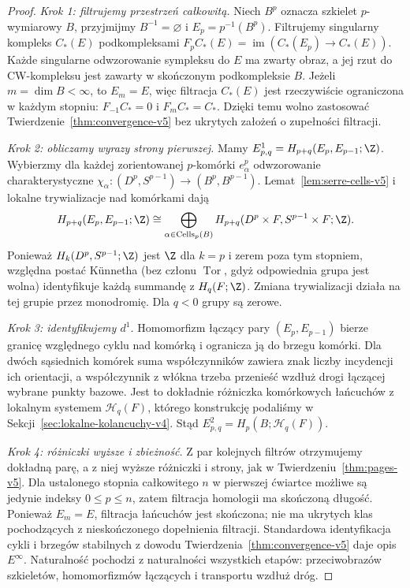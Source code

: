 \begin{proof}
\emph{Krok 1: filtrujemy przestrzeń całkowitą.}
Niech $B^p$ oznacza szkielet $p$-wymiarowy $B$, przyjmijmy
$B^{-1}=\varnothing$ i $E_p=p^{-1}(B^p)$.
Filtrujemy singularny kompleks $C_*(E)$ podkompleksami
$F_pC_*(E)=\operatorname{im}(C_*(E_p)\to C_*(E))$.
Każde singularne odwzorowanie sympleksu do $E$ ma zwarty obraz,
a jej rzut do CW-kompleksu jest zawarty w skończonym
podkompleksie $B$. Jeżeli $m=\dim B<\infty$, to
$E_m=E$, więc filtracja $C_*(E)$ jest rzeczywiście
ograniczona w każdym stopniu: $F_{-1}C_*=0$ i
$F_mC_*=C_*$. Dzięki temu wolno zastosować
Twierdzenie~\ref{thm:convergence-v5} bez ukrytych
założeń o zupełności filtracji.

\emph{Krok 2: obliczamy wyrazy strony pierwszej.}
Mamy $E^1_{p,q}=H_{p+q}(E_p,E_{p-1};\Z)$.
Wybierzmy dla każdej zorientowanej $p$-komórki $e^p_\alpha$
odwzorowanie charakterystyczne
$\chi_\alpha:(D^p,S^{p-1})\to(B^p,B^{p-1})$.
Lemat~\ref{lem:serre-cells-v5} i lokalne trywializacje nad komórkami dają
\[
H_{p+q}(E_p,E_{p-1};\Z)\cong
\bigoplus_{\alpha\in\operatorname{Cells}_p(B)}
H_{p+q}(D^p\times F,S^{p-1}\times F;\Z).
\]
Ponieważ $H_k(D^p,S^{p-1};\Z)$ jest $\Z$ dla $k=p$
i zerem poza tym stopniem, względna postać
Künnetha (bez członu $\operatorname{Tor}$, gdyż odpowiednia
grupa jest wolna) identyfikuje każdą summandę z
$H_q(F;\Z)$. Zmiana trywializacji działa na tej grupie
przez monodromię. Dla $q<0$ grupy są zerowe.

\emph{Krok 3: identyfikujemy $d^1$.}
Homomorfizm łączący pary $(E_p,E_{p-1})$ bierze granicę
względnego cyklu nad komórką i ogranicza ją do brzegu komórki.
Dla dwóch sąsiednich komórek suma współczynników
zawiera znak liczby incydencji ich orientacji, a
współczynnik z włókna trzeba przenieść wzdłuż drogi
łączącej wybrane punkty bazowe. Jest to dokładnie
różniczka komórkowych łańcuchów z lokalnym systemem
$\mathcal H_q(F)$, którego konstrukcję podaliśmy w
Sekcji~\ref{sec:lokalne-kolancuchy-v4}.
Stąd $E^2_{p,q}=H_p(B;\mathcal H_q(F))$.

\emph{Krok 4: różniczki wyższe i zbieżność.}
Z par kolejnych filtrów otrzymujemy dokładną parę,
a z niej wyższe różniczki i strony, jak w
Twierdzeniu~\ref{thm:pages-v5}.
Dla ustalonego stopnia całkowitego $n$ w pierwszej ćwiartce
możliwe są jedynie indeksy $0\le p\le n$,
zatem filtracja homologii ma skończoną długość.
Ponieważ $E_m=E$, filtracja łańcuchów jest skończona;
nie ma ukrytych klas pochodzących z nieskończonego
dopełnienia filtracji. Standardowa
identyfikacja cykli i brzegów stabilnych z dowodu
Twierdzenia~\ref{thm:convergence-v5} daje opis $E^\infty$.
Naturalność pochodzi z naturalności wszystkich etapów:
przeciwobrazów szkieletów, homomorfizmów łączących i
transportu wzdłuż dróg.
\end{proof}

